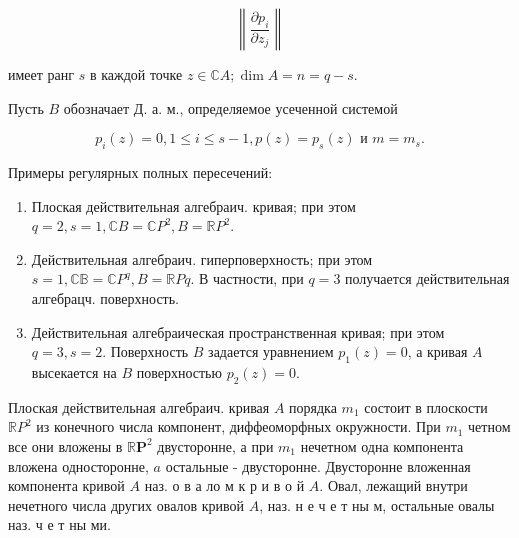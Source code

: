 \documentclass[10pt]{article}
\begin{document}
\[

\left\|\frac{\partial p_{i}}{\partial z_{j}}\right\|

\]



имеет ранг $s$ в каждой точке $z \in \mathbb{C} A ; \operatorname{dim} A=n=q-s$.



Пусть $B$ обозначает Д. а. м., определяемое усеченной системой



\[

p_{i}(z)=0,1 \leqslant i \leqslant s-1, p(z)=p_{s}(z) \text { и } m=m_{s} .

\]



Примеры регулярных полных пересечений:



\begin{enumerate}

  \item Плоская действительная алгебраич. кривая; при этом $q=2, s=1, \mathbb{C} B=\mathbb{C} P^{2}, B=\mathbb{R} P^{2}$.



  \item Действительная алгебраич. гиперповерхность; при этом $s=1, \mathbb{C B}=\mathbb{C} P^{q}, B=\mathbb{R} P q$. В частности, при $q=3$ получается действительная алгебрацч. поверхность.



  \item Действительная алгебраическая пространственная кривая; при этом $q=3, s=2$. Поверхность $B$ задается уравнением $p_{1}(z)=0$, а кривая $A$ высекается на $B$ поверхностью $p_{2}(z)=0$.



\end{enumerate}



Плоская действительная алгебраич. кривая $A$ порядка $m_{1}$ состоит в плоскости $\mathbb{R} P^{2}$ из конечного числа компонент, диффеоморфных окружности. При $m_{1}$ четном все они вложены в $\mathbb{R} \boldsymbol{P}^{2}$ двусторонне, а при $m_{1}$ нечетном одна компонента вложена односторонне, $a$ остальные - двусторонне. Двусторонне вложенная компонента кривой $A$ наз. о в а ло м к р и в о й $A$. Овал, лежащий внутри нечетного числа других овалов кривой $A$, наз. н е ч е т ны м, остальные овалы наз. ч е т ны ми.
\end{document}

